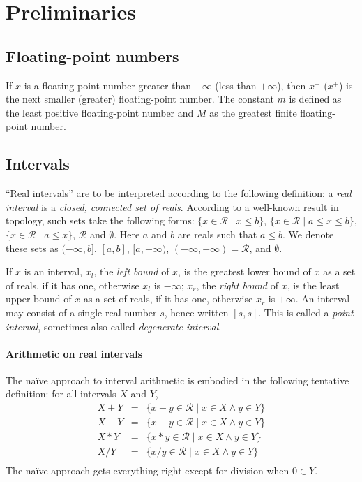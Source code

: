 \documentclass[11pt]{article}
\newcommand{\R}{\mathcal{R}}
\begin{document}
\section{Preliminaries}
\label{preliminaries}

\subsection{Floating-point numbers}
If $x$ is a floating-point number greater than $-\infty$ (less than
$+\infty$), then $x^-$ ($x^+$) is the next smaller (greater)
floating-point number. The constant $m$ is defined as the least
positive floating-point number and $M$ as the greatest finite
floating-point number.

\subsection{Intervals}

``Real intervals'' are to be interpreted according to the following
definition: a \emph{real interval} is a \emph{closed, connected set of
  reals}.
According to a well-known result in topology,
such sets take the following forms:
$\{x \in \R \mid x \leq b \}$,
$\{x \in \R \mid a \leq x \leq b \}$,
$\{x \in \R \mid a \leq x \}$,
$\R$ and $\emptyset$.
Here $a$ and $b$ are reals such that $a \leq b$.
We denote these sets as $(-\infty, b]$,
$[a,b]$, $[a, +\infty)$, $(-\infty, +\infty) = \R$, and $\emptyset$.

If $x$ is an interval, $x_l$, the \emph{left bound} of $x$,
is the greatest lower bound of $x$ as a set of reals,
if it has one, otherwise $x_l$ is $-\infty$;
$x_r$, the \emph{right bound} of $x$,
is the least upper bound of $x$ as a set of reals,
if it has one, otherwise $x_r$ is $+\infty$.
An interval may consist of a single real number $s$, hence written
$[s,s]$.  This is called a \emph{point interval}, sometimes also
called \emph{degenerate interval}.

\paragraph{Arithmetic on real intervals}

The na\"{i}ve approach to interval arithmetic is embodied in the
following tentative definition:
for all intervals $X$ and $Y$,
\begin{eqnarray*}
X + Y & = & \{ x+y \in \R \mid x \in X \wedge y \in Y \}   \\
X - Y & = & \{ x-y \in \R \mid x \in X \wedge y \in Y \}   \\
X * Y & = & \{ x*y \in \R \mid x \in X \wedge y \in Y \}   \\
X / Y & = & \{ x/y \in \R \mid x \in X \wedge y \in Y \}   \\
\end{eqnarray*}
The na\"{i}ve approach gets everything right
except for division when $0 \in Y$.
\end{document}
